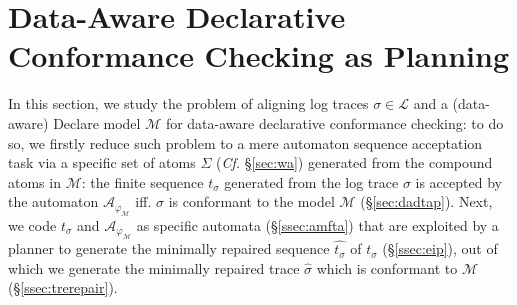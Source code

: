 \section{Data-Aware Declarative Conformance Checking as Planning}\label{sec:dccap}
In this section, we study the problem of aligning log traces $\sigma\in\mathcal{L}$ and a (data-aware) Declare model $\mathcal{M}$ for data-aware declarative conformance checking: to do so, we firstly reduce such problem to a mere automaton sequence acceptation task via a specific set of atoms $\Sigma$ (\textit{Cf.} \S\ref{sec:wa}) generated from the compound atoms in $\mathcal{M}$: the finite sequence $t_\sigma$ generated from the log trace $\sigma$ is accepted by the automaton $\mathcal{A}_{\varphi_{\mathcal{M}}}$ iff. $\sigma$ is conformant to the model $\mathcal{M}$ (\S\ref{sec:dadtap}). Next, we code $t_\sigma$ and $\mathcal{A}_{\varphi_{\mathcal{M}}}$ as specific automata (\S\ref{ssec:amfta}) that are exploited by a planner to generate the minimally repaired sequence $\hat{t_\sigma}$ of $t_\sigma$ (\S\ref{ssec:eip}), out of which we generate the minimally repaired trace $\hat{\sigma}$ which is conformant to $\mathcal{M}$ (\S\ref{ssec:trerepair}).






